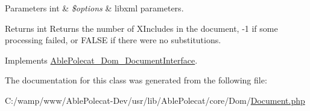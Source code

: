 \begin{DoxyParams}[1]{Parameters}
int & {\em \$options} & libxml parameters.\\
\hline
\end{DoxyParams}
\begin{DoxyReturn}{Returns}
int Returns the number of X\+Includes in the document, -\/1 if some processing failed, or F\+A\+L\+S\+E if there were no substitutions. 
\end{DoxyReturn}


Implements \hyperlink{interface_able_polecat___dom___document_interface_a3d0818bb6eda112a1b359cc41b40b2a9}{Able\+Polecat\+\_\+\+Dom\+\_\+\+Document\+Interface}.



The documentation for this class was generated from the following file\+:\begin{DoxyCompactItemize}
\item 
C\+:/wamp/www/\+Able\+Polecat-\/\+Dev/usr/lib/\+Able\+Polecat/core/\+Dom/\hyperlink{_document_8php}{Document.\+php}\end{DoxyCompactItemize}
